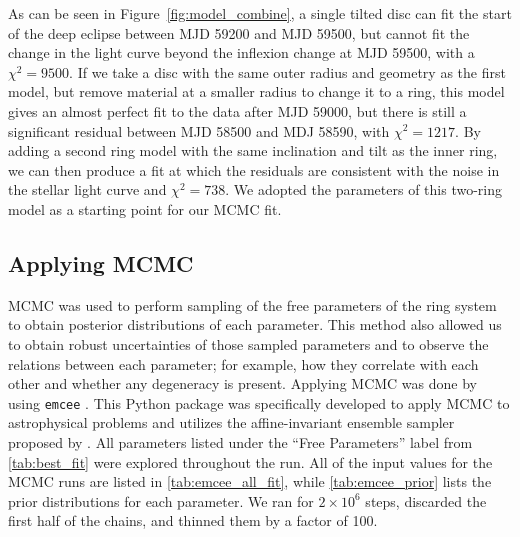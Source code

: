\documentclass[letter]{aa} %
\begin{document}
As can be seen in Figure~\ref{fig:model_combine}, a single tilted disc can fit the start of the deep eclipse between MJD 59200 and MJD 59500, but cannot fit the change in the light curve beyond the inflexion change at MJD 59500, with a $\chi^2=9500$.
%
If we take a disc with the same outer radius and geometry as the first model, but remove material at a smaller radius to change it to a ring, this model gives an almost perfect fit to the data after MJD 59000, but there is still a significant residual between MJD 58500 and MDJ 58590, with $\chi^2=1217$.
%
By adding a second ring model with the same inclination and tilt as the inner ring, we can then produce a fit at which the residuals are consistent with the noise in the stellar light curve and $\chi^2=738$.
%
We adopted the parameters of this two-ring model as a starting point for our MCMC fit.

\subsection{Applying MCMC}
\label{sec:apply_mcmc}

MCMC was used to perform sampling of the free parameters of the ring system to obtain posterior distributions of each parameter. 
%
This method also allowed us to obtain robust uncertainties of those sampled parameters and to observe the relations between each parameter; for example, how they correlate with each other and whether any degeneracy is present. 
%
Applying MCMC was done by using \texttt{emcee} \citep{emcee}. 
%
This Python package was specifically developed to apply MCMC to astrophysical problems and utilizes the affine-invariant ensemble sampler proposed by \cite{2010CAMCS...5...65G}.
All parameters listed under the ``Free Parameters'' label from \ref{tab:best_fit} were explored throughout the run. 
%
All of the input values for the MCMC runs are listed in \ref{tab:emcee_all_fit}, while \ref{tab:emcee_prior} lists the prior distributions for each parameter. 
%
We ran for $2\times 10^6$ steps, discarded the first half of the chains, and thinned them by a factor of 100.
\end{document}
